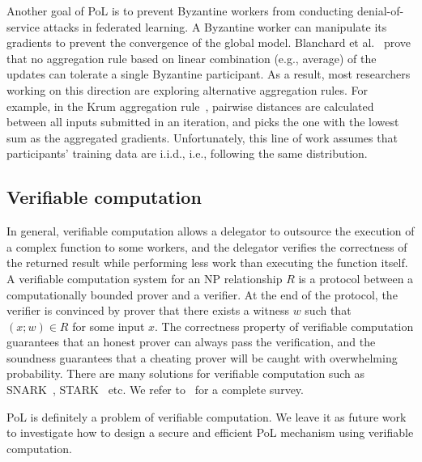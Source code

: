 \documentclass[conference]{IEEEtran}
\begin{document}
Another goal of PoL is to prevent {Byzantine\EndAccSupp{}} {workers\EndAccSupp{}} from conducting denial-of-service attacks in federated learning. 
A {Byzantine\EndAccSupp{}} {worker\EndAccSupp{}} can manipulate its gradients to prevent the convergence of the global model.
{Blanchard\EndAccSupp{}} et al.~\cite{NIPS2017_f4b9ec30} prove that no aggregation rule based on linear combination (e.g., average) of the updates can tolerate a single Byzantine participant.
As a result, most {researchers\EndAccSupp{}} working on this {direction\EndAccSupp{}} are exploring alternative aggregation rules.
For example, in the {Krum\EndAccSupp{}} aggregation rule~\cite{NIPS2017_f4b9ec30}, pairwise distances are calculated between all inputs submitted in an iteration, and picks the one with the lowest sum as the aggregated gradients.
Unfortunately, this line of work assumes that participants' training data are i.i.d., i.e., following the same distribution. 


\subsection{Verifiable computation}

In general, verifiable computation allows a delegator to outsource the execution of a complex function to some workers, and the delegator verifies the correctness of the returned result while performing less work than executing the function itself. 
A verifiable computation system for an NP relationship $R$ is a protocol between a computationally bounded prover and a verifier. 
At the end of the protocol, the verifier is convinced by prover that there exists a witness $w$ such that $(x; w) \in R$ for some input $x$. 
The correctness property of verifiable computation guarantees that an honest prover can always pass the verification, and the soundness guarantees that a cheating prover will be caught with overwhelming probability. 
There are many {solutions\EndAccSupp{}} for verifiable computation such as SNARK~\cite{Pinocchio,libsnark}, STARK~\cite{libstark} etc.
We refer to~\cite{walfish2015verifying} for a {complete\EndAccSupp{}} survey.

PoL is definitely a problem of verifiable computation. We leave it as future work to investigate how to design a {secure\EndAccSupp{}} and {efficient\EndAccSupp{}} PoL mechanism using verifiable computation.  
\end{document}

